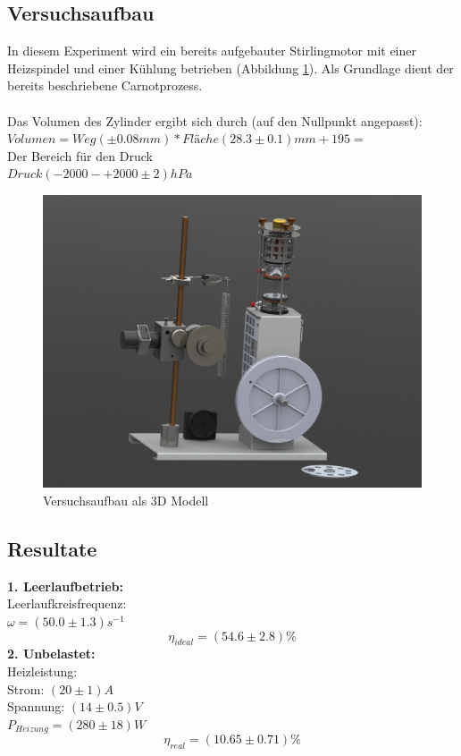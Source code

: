 \documentclass[12pt,a4paper]{article}
\begin{document}
\begin{multicols}{2}
\subsection{Versuchsaufbau}
In diesem Experiment wird ein bereits aufgebauter Stirlingmotor mit einer Heizspindel und einer Kühlung betrieben (Abbildung  \ref{fig:stirlingMotor_3D}). Als Grundlage dient der bereits beschriebene Carnotprozess. \\
\\
Das Volumen des Zylinder ergibt sich durch (auf den Nullpunkt angepasst):\\
$Volumen = Weg (\pm 0.08mm) * Fläche (28.3 \pm 0.1)mm + 195 = $\\ %
Der Bereich für den Druck\\
$Druck (-2000 - +2000 \pm 2) hPa$\\

\begin{figure}[H]
	\centering
	\includegraphics[scale=0.25]{./data/3D-Model/PS9-model_neutral01.JPG}
	\caption{Versuchsaufbau als 3D Modell}
	\label{fig:stirlingMotor_3D}
\end{figure}



\subsection{Resultate}
\textbf{1. Leerlaufbetrieb:}\\
Leerlaufkreisfrequenz:\\
$\omega=(50.0 \pm 1.3)s^{-1}$
$$\eta_{ideal}=(54.6 \pm 2.8)\%$$
\textbf{2. Unbelastet:}\\
Heizleistung:\\
Strom: $(20 \pm 1) A$\\
Spannung: $(14 \pm 0.5) V$\\
$P_{Heizung}=(280 \pm 18)W$\\
$$\eta_{real}=(10.65 \pm 0.71)\%$$\\


\end{multicols}
\end{document}
